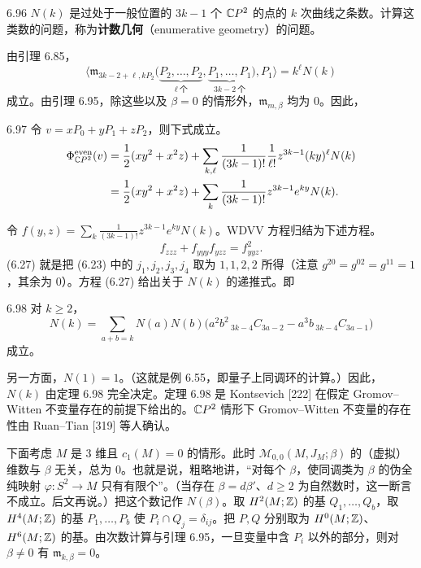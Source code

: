 \begin{remark}{6.96}
  $N(k)$ 是过处于一般位置的 $3k-1$ 个 $\mathbb{C} P^2$ 的点的 $k$ 次曲线之条数。计算这类数的问题，称为\textbf{计数几何}（enumerative geometry）的问题。
\end{remark}

由引理 6.85，
\[
  \Big\langle\mathfrak{m}_{3k-2+\ell,kP_2}
  \big(\underbrace{P_2,\dots,P_2}_{\ell\ \text{个}},
  \underbrace{P_1,\dots,P_1}_{3k-2\ \text{个}}\big),P_1\Big\rangle
  =k^\ell N(k)
\]
成立。由引理 6.95，除这些以及 $\beta=0$ 的情形外，$\mathfrak{m}_{m,\beta}$ 均为 $0$。因此，

\begin{lemma}{6.97}
  令 $v=xP_0+yP_1+zP_2$，则下式成立。
  \[
  \begin{aligned}
    \Phi^{\mathrm{even}}_{\mathbb{C} P^2}(v)
    &=\frac12(xy^2+x^2z)+\sum_{k,\ell}\frac{1}{(3k-1)!}\frac{1}{\ell!}
    z^{3k-1}(ky)^\ell N(k)\\
    &=\frac12(xy^2+x^2z)+\sum_k\frac{1}{(3k-1)!}z^{3k-1}e^{ky}N(k).
  \end{aligned}
  \]
\end{lemma}

令 $f(y,z)=\sum_k\frac{1}{(3k-1)!}z^{3k-1}e^{ky}N(k)$。WDVV 方程归结为下述方程。
\begin{equation}
  f_{zzz}+f_{yyy}f_{yzz}=f_{yyz}^2 . \tag{6.27}
\end{equation}
(6.27) 就是把 (6.23) 中的 $j_1,j_2,j_3,j_4$ 取为 $1,1,2,2$ 所得（注意 $g^{20}=g^{02}=g^{11}=1$，其余为 $0$）。方程 (6.27) 给出关于 $N(k)$ 的递推式。即

\begin{theorem}{6.98}
  对 $k\ge2$，
  \[
    N(k)=\sum_{a+b=k}N(a)N(b)
    \big(a^2b^2\,{}_{3k-4}C_{3a-2}-a^3b\,{}_{3k-4}C_{3a-1}\big)
  \]
  成立。
\end{theorem}

另一方面，$N(1)=1$。（这就是例 6.55，即量子上同调环的计算。）因此，$N(k)$ 由定理 6.98 完全决定。定理 6.98 是 Kontsevich [222] 在假定 Gromov–Witten 不变量存在的前提下给出的。$\mathbb{C} P^2$ 情形下 Gromov–Witten 不变量的存在性由 Ruan–Tian [319] 等人确认。


下面考虑 $M$ 是 $3$ 维且 $c_1(M)=0$ 的情形。此时 $\mathcal{M}_{0,0}(M,J_M;\beta)$ 的（虚拟）维数与 $\beta$ 无关，总为 $0$。也就是说，粗略地讲，“对每个 $\beta$，使同调类为 $\beta$ 的伪全纯映射 $\varphi\colon S^2\to M$ 只有有限个”。（当存在 $\beta=d\beta'$、$d\ge2$ 为自然数时，这一断言不成立。后文再说。）把这个数记作 $N(\beta)$。取 $H^2(M;\mathbb{Z})$ 的基 $Q_1,\dots,Q_b$，取 $H^4(M;\mathbb{Z})$ 的基 $P_1,\dots,P_b$ 使 $P_i\cap Q_j=\delta_{ij}$。把 $P,Q$ 分别取为 $H^0(M;\mathbb{Z})$、$H^6(M;\mathbb{Z})$ 的基。由次数计算与引理 6.95，一旦变量中含 $P_i$ 以外的部分，则对 $\beta\ne0$ 有 $\mathfrak{m}_{k,\beta}=0$。

